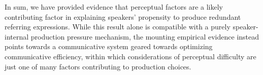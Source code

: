 \documentclass[12pt,letterpaper]{article}
\begin{document}
In sum, we have provided evidence that perceptual factors are a likely contributing factor in explaining speakers' propensity to produce redundant referring expressions. While this result alone is compatible with a purely speaker-internal production pressure mechanism, the mounting empirical evidence instead points towards a communicative system geared towards optimizing communicative efficiency, within which considerations of perceptual difficulty are just one of many factors contributing to production choices.


\setlength{\bibsep}{0pt plus 0.3ex}
\setlength{\bibhang}{0.3in}			%
\titleformat{\section}{\normalfont\bfseries}{\thesection}{.5em}{}		
\end{document}
